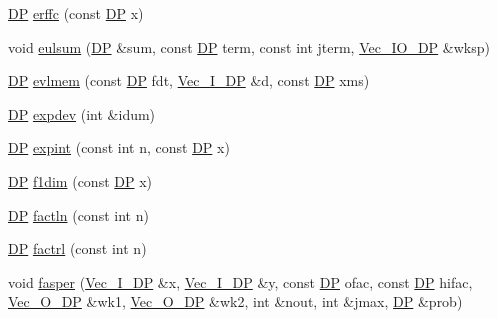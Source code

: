 \begin{DoxyCompactItemize}
\mbox{\hyperlink{namespaceNR_af6ff762dd605ff477b8e52387253a02a}{DP}} \mbox{\hyperlink{namespaceNR_ab32cef5a592608701b19750c27605413}{erffc}} (const \mbox{\hyperlink{namespaceNR_af6ff762dd605ff477b8e52387253a02a}{DP}} x)
\item 
void \mbox{\hyperlink{namespaceNR_af6b58017e35503e394fd95ac85f8fbb7}{eulsum}} (\mbox{\hyperlink{namespaceNR_af6ff762dd605ff477b8e52387253a02a}{DP}} \&sum, const \mbox{\hyperlink{namespaceNR_af6ff762dd605ff477b8e52387253a02a}{DP}} term, const int jterm, \mbox{\hyperlink{namespaceNR_ab293e06a6bf799d8a7ed932b6852bcb8}{Vec\+\_\+\+I\+O\+\_\+\+DP}} \&wksp)
\item 
\mbox{\hyperlink{namespaceNR_af6ff762dd605ff477b8e52387253a02a}{DP}} \mbox{\hyperlink{namespaceNR_acf9bcd45ac074c4fc27723f2093d332e}{evlmem}} (const \mbox{\hyperlink{namespaceNR_af6ff762dd605ff477b8e52387253a02a}{DP}} fdt, \mbox{\hyperlink{namespaceNR_a9f943da53862537c552e2a770cb170ae}{Vec\+\_\+\+I\+\_\+\+DP}} \&d, const \mbox{\hyperlink{namespaceNR_af6ff762dd605ff477b8e52387253a02a}{DP}} xms)
\item 
\mbox{\hyperlink{namespaceNR_af6ff762dd605ff477b8e52387253a02a}{DP}} \mbox{\hyperlink{namespaceNR_aa445323c2e4f1c7d6859208169d37307}{expdev}} (int \&idum)
\item 
\mbox{\hyperlink{namespaceNR_af6ff762dd605ff477b8e52387253a02a}{DP}} \mbox{\hyperlink{namespaceNR_a03af1157f0cf4a00d857e0dde2483104}{expint}} (const int n, const \mbox{\hyperlink{namespaceNR_af6ff762dd605ff477b8e52387253a02a}{DP}} x)
\item 
\mbox{\hyperlink{namespaceNR_af6ff762dd605ff477b8e52387253a02a}{DP}} \mbox{\hyperlink{namespaceNR_a6c415158b378bbd03f785e29d8a7ac1f}{f1dim}} (const \mbox{\hyperlink{namespaceNR_af6ff762dd605ff477b8e52387253a02a}{DP}} x)
\item 
\mbox{\hyperlink{namespaceNR_af6ff762dd605ff477b8e52387253a02a}{DP}} \mbox{\hyperlink{namespaceNR_a828437d33b110b7b79516767e7df7b23}{factln}} (const int n)
\item 
\mbox{\hyperlink{namespaceNR_af6ff762dd605ff477b8e52387253a02a}{DP}} \mbox{\hyperlink{namespaceNR_ac76d8c81ea3f7dacb7bc39f8f2e67f0a}{factrl}} (const int n)
\item 
void \mbox{\hyperlink{namespaceNR_a28ce9fba247ed103e2ffb545d671840e}{fasper}} (\mbox{\hyperlink{namespaceNR_a9f943da53862537c552e2a770cb170ae}{Vec\+\_\+\+I\+\_\+\+DP}} \&x, \mbox{\hyperlink{namespaceNR_a9f943da53862537c552e2a770cb170ae}{Vec\+\_\+\+I\+\_\+\+DP}} \&y, const \mbox{\hyperlink{namespaceNR_af6ff762dd605ff477b8e52387253a02a}{DP}} ofac, const \mbox{\hyperlink{namespaceNR_af6ff762dd605ff477b8e52387253a02a}{DP}} hifac, \mbox{\hyperlink{namespaceNR_a970094d23441f8ef6a45282a7eb2103d}{Vec\+\_\+\+O\+\_\+\+DP}} \&wk1, \mbox{\hyperlink{namespaceNR_a970094d23441f8ef6a45282a7eb2103d}{Vec\+\_\+\+O\+\_\+\+DP}} \&wk2, int \&nout, int \&jmax, \mbox{\hyperlink{namespaceNR_af6ff762dd605ff477b8e52387253a02a}{DP}} \&prob)

\end{DoxyCompactItemize}
